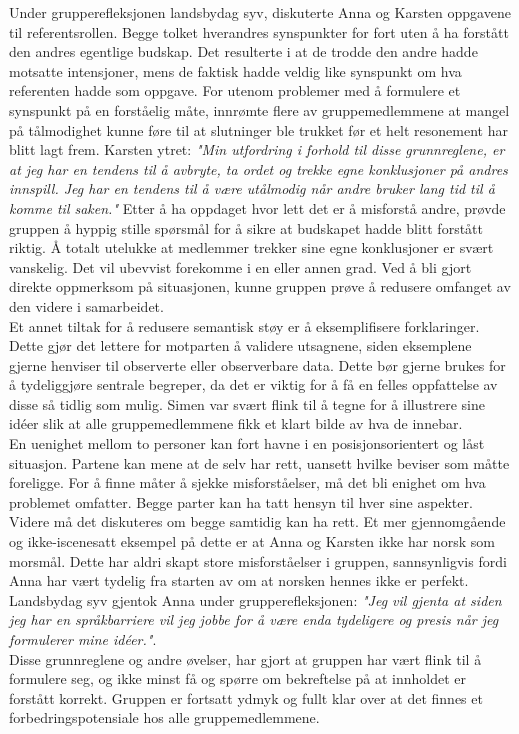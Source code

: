 Under grupperefleksjonen landsbydag syv, diskuterte Anna og Karsten oppgavene til referentsrollen.
Begge tolket hverandres synspunkter for fort uten å ha forstått den andres egentlige budskap.
Det resulterte i at de trodde den andre hadde motsatte intensjoner, mens de faktisk hadde veldig like synspunkt om hva referenten hadde som oppgave. 
For utenom problemer med å formulere et synspunkt på en forståelig måte, innrømte flere av gruppemedlemmene at mangel på tålmodighet kunne føre til at slutninger ble trukket før et helt resonement har blitt lagt frem. 
Karsten ytret: \emph{"Min utfordring i forhold til disse grunnreglene, er at jeg har en tendens til å avbryte, ta ordet og trekke egne konklusjoner på andres innspill. Jeg har en tendens til å være utålmodig når andre bruker lang tid til å komme til saken."}
Etter å ha oppdaget hvor lett det er å misforstå andre, prøvde gruppen å hyppig stille spørsmål for å sikre at budskapet hadde blitt forstått riktig.
Å totalt utelukke at medlemmer trekker sine egne konklusjoner er svært vanskelig. Det vil ubevvist forekomme i en eller annen grad.
Ved å bli gjort direkte oppmerksom på situasjonen, kunne gruppen prøve å redusere omfanget av den videre i samarbeidet. \\

Et annet tiltak for å redusere semantisk støy er å eksemplifisere forklaringer.
Dette gjør det lettere for motparten å validere utsagnene, siden eksemplene gjerne henviser til observerte eller observerbare data.
Dette bør gjerne brukes for å tydeliggjøre sentrale begreper, da det er viktig for å få en felles oppfattelse av disse så tidlig som mulig.
Simen var svært flink til å tegne for å illustrere sine idéer slik at alle gruppemedlemmene fikk et klart bilde av hva de innebar. \\

En uenighet mellom to personer kan fort havne i en posisjonsorientert og låst situasjon.
Partene kan mene at de selv har rett, uansett hvilke beviser som måtte foreligge.
For å finne måter å sjekke misforståelser, må det bli enighet om hva problemet omfatter. Begge parter kan ha tatt hensyn til hver sine aspekter.
Videre må det diskuteres om begge samtidig kan ha rett.
Et mer gjennomgående og ikke-iscenesatt eksempel på dette er at Anna og Karsten ikke har norsk som morsmål.
Dette har aldri skapt store misforståelser i gruppen, sannsynligvis fordi Anna har vært tydelig fra starten av om at norsken hennes ikke er perfekt.
Landsbydag syv gjentok Anna under grupperefleksjonen: \emph{"Jeg vil gjenta at siden jeg har en språkbarriere vil jeg jobbe for å være enda tydeligere og presis når jeg formulerer mine idéer."}. \\

Disse grunnreglene og andre øvelser, har gjort at gruppen har vært flink til å formulere seg, og ikke minst få og spørre om bekreftelse på at innholdet er forstått korrekt.
Gruppen er fortsatt ydmyk og fullt klar over at det finnes et forbedringspotensiale hos alle gruppemedlemmene.
